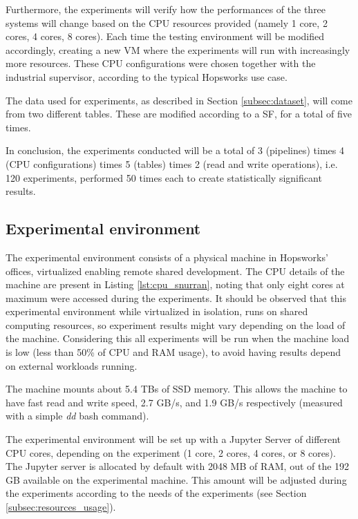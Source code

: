 Furthermore, the experiments will verify how the performances of the three systems will change based on the \gls{CPU} resources provided (namely 1 core, 2 cores, 4 cores, 8 cores). Each time the testing environment will be modified accordingly, creating a new \gls{VM} where the experiments will run with increasingly more resources. These \gls{CPU} configurations were chosen together with the industrial supervisor, according to the typical Hopsworks use case.

The data used for experiments, as described in Section \ref{subsec:dataset}, will come from two different tables. These are modified according to a \gls{SF}, for a total of five times.

In conclusion, the experiments conducted will be a total of 3 (pipelines) times 4 (\gls{CPU} configurations) times 5 (tables) times 2 (read and write operations), i.e. 120 experiments, performed 50 times each to create statistically significant results.

\subsection{Experimental environment}
\label{subsec:exp_env}

The experimental environment consists of a physical machine in Hopsworks' offices, virtualized enabling remote shared development. The \gls{CPU} details of the machine are present in Listing \ref{lst:cpu_snurran}, noting that only eight cores at maximum were accessed during the experiments. It should be observed that this experimental environment while virtualized in isolation, runs on shared computing resources, so experiment results might vary depending on the load of the machine. Considering this all experiments will be run when the machine load is low (less than 50\% of \gls{CPU} and \gls{RAM} usage), to avoid having results depend on external workloads running.

The machine mounts about 5.4 TBs of \gls{SSD} memory. This allows the machine to have fast read and write speed, 2.7 GB/s, and 1.9 GB/s respectively (measured with a simple \textit{dd} bash command). 

The experimental environment will be set up with a Jupyter Server of different CPU cores, depending on the experiment (1 core, 2 cores, 4 cores, or 8 cores). The Jupyter server is allocated by default with 2048 MB of \gls{RAM}, out of the 192 GB  available on the experimental machine. This amount will be adjusted during the experiments according to the needs of the experiments (see Section \ref{subsec:resources_usage}).

